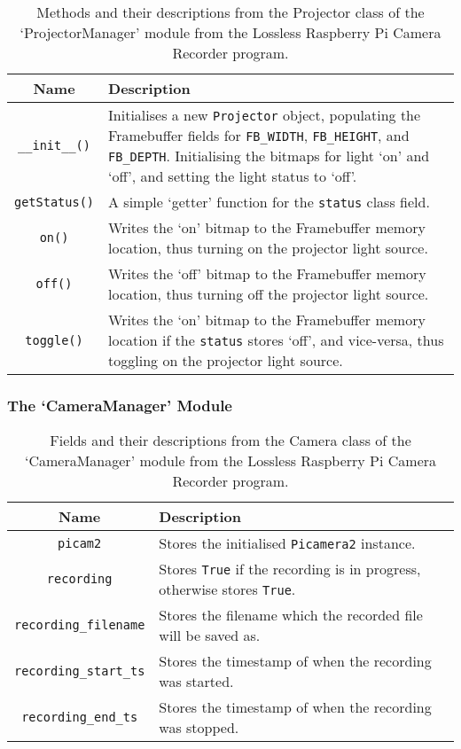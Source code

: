 \begin{table}[H]
    \centering
    \begin{tabularx}{\linewidth}{c | X}
        Name    &   Description\\
        \hline
        \hline
        \texttt{\_\_init\_\_()}     &   Initialises a new \texttt{Projector} object, populating the Framebuffer fields for \texttt{FB\_WIDTH}, \texttt{FB\_HEIGHT}, and \texttt{FB\_DEPTH}. Initialising the bitmaps for light `on' and `off', and setting the light status to `off'.\\
        \hline
        \texttt{getStatus()}     &   A simple `getter' function for the \texttt{status} class field.\\
        \hline
        \texttt{on()}     &   Writes the `on' bitmap to the Framebuffer memory location, thus turning on the projector light source.\\
        \hline
        \texttt{off()}     &   Writes the `off' bitmap to the Framebuffer memory location, thus turning off the projector light source.\\
        \hline
        \texttt{toggle()}     &   Writes the `on' bitmap to the Framebuffer memory location if the \texttt{status} stores `off', and vice-versa, thus toggling on the projector light source.\\
        \hline
    \end{tabularx}
    \caption{Methods and their descriptions from the Projector class of the `ProjectorManager' module from the Lossless Raspberry Pi Camera Recorder program.}
    \label{table:projectormanagerclassfuncs}
\end{table}

\subsubsection{The `CameraManager' Module}

\begin{table}[H]
    \centering
    \begin{tabularx}{\linewidth}{c | X}
        Name    &   Description\\
        \hline
        \hline
        \texttt{picam2} & Stores the initialised \texttt{Picamera2} instance.\\
        \hline
        \texttt{recording} & Stores \texttt{True} if the recording is in progress, otherwise stores \texttt{True}.\\
        \hline
        \texttt{recording\_filename} & Stores the filename which the recorded file will be saved as.\\
        \hline
        \texttt{recording\_start\_ts} & Stores the timestamp of when the recording was started.\\
        \hline
        \texttt{recording\_end\_ts} & Stores the timestamp of when the recording was stopped.\\
        \hline
    \end{tabularx}
    \caption{Fields and their descriptions from the Camera class of the `CameraManager' module from the Lossless Raspberry Pi Camera Recorder program.}
    \label{table:cameramanagerclassfields}
\end{table}

